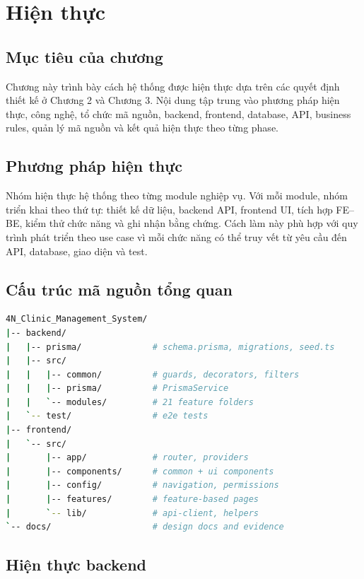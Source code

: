 \chapter{Hiện thực}

\section{Mục tiêu của chương}

Chương này trình bày cách hệ thống được hiện thực dựa trên các quyết định thiết kế ở Chương 2 và Chương 3. Nội dung tập trung vào phương pháp hiện thực, công nghệ, tổ chức mã nguồn, backend, frontend, database, API, business rules, quản lý mã nguồn và kết quả hiện thực theo từng phase.

\section{Phương pháp hiện thực}

Nhóm hiện thực hệ thống theo từng module nghiệp vụ. Với mỗi module, nhóm triển khai theo thứ tự: thiết kế dữ liệu, backend API, frontend UI, tích hợp FE--BE, kiểm thử chức năng và ghi nhận bằng chứng. Cách làm này phù hợp với quy trình phát triển theo use case vì mỗi chức năng có thể truy vết từ yêu cầu đến API, database, giao diện và test.

\section{Cấu trúc mã nguồn tổng quan}

\begin{lstlisting}[language=bash,caption={Cấu trúc codebase rút gọn}]
4N_Clinic_Management_System/
|-- backend/
|   |-- prisma/              # schema.prisma, migrations, seed.ts
|   |-- src/
|   |   |-- common/          # guards, decorators, filters
|   |   |-- prisma/          # PrismaService
|   |   `-- modules/         # 21 feature folders
|   `-- test/                # e2e tests
|-- frontend/
|   `-- src/
|       |-- app/             # router, providers
|       |-- components/      # common + ui components
|       |-- config/          # navigation, permissions
|       |-- features/        # feature-based pages
|       `-- lib/             # api-client, helpers
`-- docs/                    # design docs and evidence
\end{lstlisting}

\section{Hiện thực backend}

